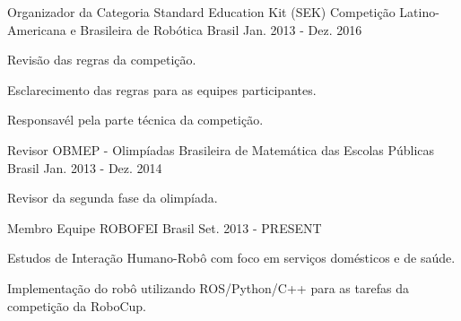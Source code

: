 

\begin{cventries}

  \cventry
    {Organizador da Categoria Standard Education Kit (SEK)} %
    {Competição Latino-Americana e Brasileira de Robótica} %
    {Brasil} %
    {Jan. 2013 - Dez. 2016} %
    {
      \begin{cvitems} %
        \item {Revisão das regras da competição.}
        \item {Esclarecimento das regras para as equipes participantes.}
        \item {Responsavél pela parte técnica da competição.}
      \end{cvitems}
    }

  \cventry
    {Revisor} %
    {OBMEP - Olimpíadas Brasileira de Matemática das Escolas Públicas} %
    {Brasil} %
    {Jan. 2013 - Dez. 2014} %
    {
      \begin{cvitems} %
        \item {Revisor da segunda fase da olimpíada.}
      \end{cvitems}
    }

  \cventry
    {Membro} %
    {Equipe ROBOFEI} %
    {Brasil} %
    {Set. 2013 - PRESENT} %
    {
      \begin{cvitems} %
        \item {Estudos de Interação Humano-Robô com foco em serviços domésticos e de saúde.}
        \item {Implementação do robô utilizando ROS/Python/C++ para as tarefas da competição \@home da RoboCup.}
      \end{cvitems}
    }

\end{cventries}
